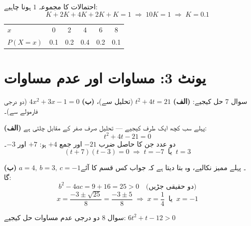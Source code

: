 \begin{hal}
احتمالات کا مجموعہ \(1\) ہونا چاہیے:
\[
K+2K+4K+2K+K=1 \;\Longrightarrow\; 10K=1 \;\Longrightarrow\; K=0.1
\]

\medskip
\begin{center}
\begin{ltrtab}
\begin{tabular}{@{}l c c c c c@{}}
\toprule
$x$      & 0   & 2   & 4   & 6   & 8   \\
$P(X=x)$ & 0.1 & 0.2 & 0.4 & 0.2 & 0.1 \\
\bottomrule
\end{tabular}
\end{ltrtab}
\end{center}


\end{hal}

\section*{یونٹ \textenglish{3}: مساوات اور عدم مساوات}

\begin{sawal}{سوال \textenglish{7}}
حل کیجیے: \textbf{(الف)} \(t^{2}+4t=21\) (تحلیل سے)، \quad
\textbf{(ب)} \(4x^{2}+3x-1=0\) (دو درجی فارمولے سے)۔
\end{sawal}

\begin{hal}
\textbf{(الف)} پہلے سب کچھ ایک طرف کیجیے --- تحلیل صرف صفر کے مقابل چلتی ہے:
\[
t^{2}+4t-21=0
\]
دو عدد جن کا حاصل ضرب \(-21\) اور جمع \(+4\) ہو: \(+7\) اور \(-3\)۔
\[
(t+7)(t-3)=0 \;\Longrightarrow\; t=-7 \ \text{ یا } \ t=3
\]

\medskip
\textbf{(ب)} \(a=4,\ b=3,\ c=-1\)۔ پہلے ممیز نکالیے، وہ بتا دیتا ہے کہ جواب کس
قسم کا آئے گا:
\[
b^{2}-4ac=9+16=25>0 \quad\text{(دو حقیقی جڑیں)}
\]
\[
x=\frac{-3\pm\sqrt{25}}{8}=\frac{-3\pm 5}{8}
\;\Longrightarrow\; x=\frac14 \ \text{ یا } \ x=-1
\]

\end{hal}

\begin{sawal}{سوال \textenglish{8}}
دو درجی عدم مساوات حل کیجیے: \(6t^{2}+t-12>0\)
\end{sawal}

